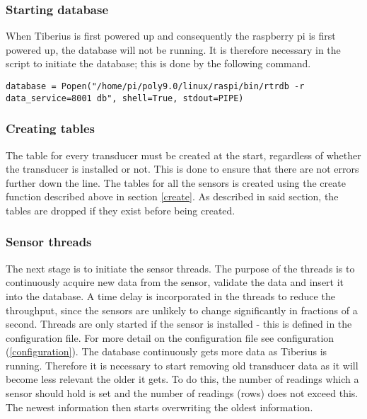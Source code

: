\subsubsection{Starting database}
When Tiberius is first powered up and consequently the raspberry pi is first powered  up, the database will not be running. 
It is therefore necessary in the script to initiate the database; this is done by the following command.

\begin{lstlisting}[style=custompython]
database = Popen("/home/pi/poly9.0/linux/raspi/bin/rtrdb -r data_service=8001 db", shell=True, stdout=PIPE)
\end{lstlisting}

\subsubsection{Creating tables}
The table for every transducer must be created at the start, regardless of whether the transducer is installed or not. This is done to ensure that there are not errors further down the line.
The tables for all the sensors is created using the create function described above in section \ref{create}. As described in said section, the tables are dropped if they exist before being created.
\subsubsection{Sensor threads}
The next stage is to initiate the sensor threads. The purpose of the threads is to continuously acquire new data from the sensor, validate the data and insert it into the database. A time delay is incorporated in the threads to reduce the throughput, since the sensors are unlikely to change significantly in fractions of a second.
\newline
Threads are only started if the sensor is installed - this is defined in the configuration file. For more detail on the configuration file see configuration (\ref{configuration}).
\newline
The database continuously gets more data as Tiberius is running. Therefore it is necessary to start removing old transducer data as it will become less relevant the older it gets. To do this, the number of readings which a sensor should hold is set and the number of readings (rows) does not exceed this.  The newest information then starts overwriting the oldest information. 

